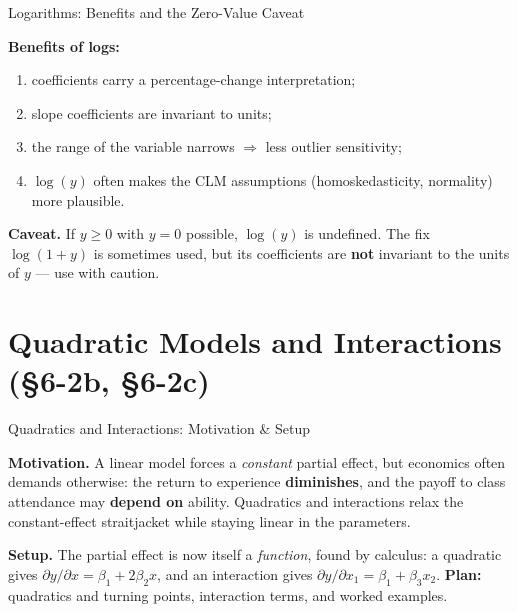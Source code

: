 \documentclass[aspectratio=169, 12pt]{beamer}
\begin{document}
\begin{frame}{Logarithms: Benefits and the Zero-Value Caveat}

  \begin{keybox}
    \textbf{Benefits of logs:}
    \begin{enumerate}
      \item coefficients carry a percentage-change interpretation;
      \item slope coefficients are invariant to units;
      \item the range of the variable narrows $\Rightarrow$ less outlier sensitivity;
      \item $\log(y)$ often makes the CLM assumptions (homoskedasticity, normality) more
        plausible.
    \end{enumerate}
  \end{keybox}

  \medskip

  \begin{highlightbox}
    \textbf{Caveat.} If $y \ge 0$ with $y = 0$ possible, $\log(y)$ is undefined. The fix
    $\log(1+y)$ is sometimes used, but its coefficients are \textbf{not} invariant to the
    units of $y$ --- use with caution.
  \end{highlightbox}

\end{frame}

\section{Quadratic Models and Interactions (\S6-2b, \S6-2c)}

\begin{frame}{Quadratics and Interactions: Motivation \& Setup}

  \begin{highlightbox}
    \textbf{Motivation.} A linear model forces a \emph{constant} partial effect, but
    economics often demands otherwise: the return to experience \textbf{diminishes},
    and the payoff to class attendance may \textbf{depend on} ability. Quadratics and
    interactions relax the constant-effect straitjacket while staying linear in the
    parameters.
  \end{highlightbox}

  \begin{keybox}
    \textbf{Setup.} The partial effect is now itself a \emph{function}, found by
    calculus: a quadratic gives $\partial y/\partial x = \beta_1 + 2\beta_2 x$, and an
    interaction gives $\partial y/\partial x_1 = \beta_1 + \beta_3 x_2$. \textbf{Plan:}
    quadratics and turning points, interaction terms, and worked examples.
  \end{keybox}

\end{frame}
\end{document}
